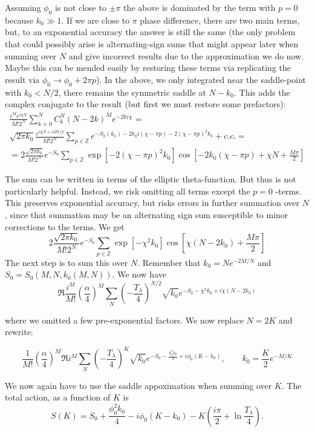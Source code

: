 Assuming $\phi_{0}$ is not close to $\pm\pi$ the above is dominated
by the term with $p=0$ because $k_{0}\gg1$. If we are close to $\pi$
phase difference, there are two main terms, but, to an exponential
accuracy the answer is still the same (the only problem that could
possibly arise is alternating-sign sums that might appear later when
summing over $N$ and give incorrect results due to the approximation
we do now. Maybe this can be mended easily by restoring these terms
via replicating the result via $\phi_{0}\rightarrow\phi_{0}+2\pi p$).
In the above, we only integrated near the saddle-point with $k_{0}<N/2$,
there remains the symmetric saddle at $N-k_{0}$. This adds the complex
conjugate to the result (but first we must restore some prefactors):
\begin{multline*}
\frac{i^{M}e^{i\chi N}}{M!2^{N}}\sum_{k=0}^{N}C_{k}^{N}(N-2k)^{M}e^{-2ki\chi}=\\
\sqrt{2\pi k_{0}}\frac{e^{i\chi N+iM\pi/2}}{M!2^{N}}\sum_{p\in\mathbb{Z}}e^{-S_{0}(k_{0})-2k_{0}i(\chi-\pi p)-2(\chi-\pi p)^{2}k_{0}}+c.c.=\\
=2\frac{\sqrt{2\pi k_{0}}}{M!2^{N}}e^{-S_{0}}\sum_{p\in\mathbb{Z}}\exp\left[-2(\chi-\pi p)^{2}k_{0}\right]\cos\left[-2k_{0}(\chi-\pi p)+\chi N+\frac{M\pi}{2}\right]
\end{multline*}

The sum can be written in terms of the elliptic theta-function. But
thus is not particularly helpful. Instead, we risk omitting all terms
except the $p=0$ -terms. This preserves exponential accuracy, but
risks errors in further summation over $N$, since that summation
may be an alternating sign sum susceptible to minor corrections to
the terms. We get
\[
2\frac{\sqrt{2\pi k_{0}}}{M!2^{N}}e^{-S_{0}}\sum_{p\in\mathbb{Z}}\exp\left[-\chi^{2}k_{0}\right]\cos\left[\chi(N-2k_{0})+\frac{M\pi}{2}\right]
\]
The next step is to sum this over $N$. Remember that $k_{0}=Ne^{-2M/N}$
and $S_{0}=S_{0}(M,N,k_{0}(M,N))$. We now have
\[
\Re\frac{i^{M}}{M!}\left(\frac{\alpha}{4}\right)^{M}\sum_{N}\left(-\frac{T_{\lambda}}{4}\right)^{N/2}\sqrt{k_{0}}e^{-S_{0}-\chi^{2}k_{0}+i\chi(N-2k_{0})}
\]

where we omitted a few pre-exponential factors. We now replace $N=2K$
and rewrite:

\[
\frac{1}{M!}\left(\frac{\alpha}{4}\right)^{M}\Re i^{M}\sum_{N}\left(-\frac{T_{\lambda}}{4}\right)^{K}\sqrt{k_{0}}e^{-S_{0}-\frac{\phi_{0}^{2}k_{0}}{4}+i\phi_{0}(K-k_{0})},\qquad k_{0}=\frac{K}{2}e^{-M/K}
\]

We now again have to use the saddle appoximation when summing over
$K$. The total action, as a function of $K$ is
\[
S(K)=S_{0}+\frac{\phi_{0}^{2}k_{0}}{4}-i\phi_{0}(K-k_{0})-K\left(\frac{i\pi}{2}+\ln\frac{T_{\lambda}}{4}\right).
\]


